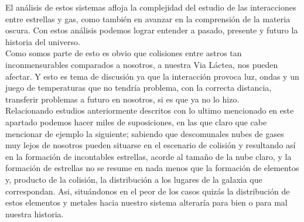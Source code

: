 \documentclass{article}
\begin{document}
{El análisis de estos sistemas afloja la complejidad del estudio de las interacciones entre estrellas y gas, como también en avanzar en la comprensión de la materia oscura. Con estos análisis podemos lograr entender a pasado, presente y futuro la historia del universo.\\

Como somos parte de esto es obvio que colisiones entre astros tan inconmensurables comparados a nosotros, a nuestra Via Láctea, nos pueden afectar. Y esto es tema de discusión ya que la interacción provoca luz, ondas y un juego de temperaturas que no tendría problema, con la correcta distancia, transferir problemas a futuro en nosotros, si es que ya no lo hizo.\\

Relacionando estudios anteriormente descritos con lo ultimo mencionado en este apartado podemos hacer miles de suposiciones, en las que claro que cabe mencionar de ejemplo la siguiente; sabiendo que descomunales nubes de gases muy lejos de nosotros pueden situarse en el escenario de colisión y resultando así en la formación de incontables estrellas, acorde al tamaño de la nube claro, y la formación de estrellas no se resume en nada menos que la formación de elementos y, producto de la colisión, la distribución a los lugares de la galaxia que correspondan. Asi, situándonos en el peor de los casos quizás la distribución de estos elementos y metales hacia nuestro sistema alteraría para bien o para mal nuestra historia.\\


}


\makepgtwo   %

%
%


\bigskip 
\end{document}
